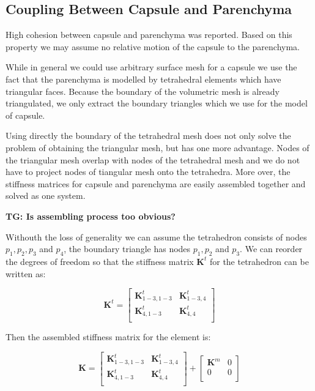 \documentclass{llncs}
\newcommand{\TG}[1]{{\color{blue}\textbf{TG: #1}}}
\newcommand{\Mat}[1]{\mathbf{#1}}
\begin{document}

\subsection{Coupling Between Capsule and Parenchyma} %

High cohesion between capsule and parenchyma was reported. Based on this
property we may assume no relative motion of the capsule to the parenchyma.

While in general we could use arbitrary surface mesh for a capsule we use
the fact that the parenchyma is modelled by tetrahedral elements which have
triangular faces. Because the boundary of the volumetric mesh is already
triangulated, we only extract the boundary triangles which we use for the
model of capsule.

Using directly the boundary of the tetrahedral mesh does not only solve the
problem of obtaining the triangular mesh, but has one more advantage. Nodes
of the triangular mesh overlap with nodes of the tetrahedral mesh and we do
not have to project nodes of tiangular mesh onto the tetrahedra. More over,
the stiffness matrices for capsule and parenchyma are easily assembled
together and solved as one system.

\TG{Is assembling process too obvious?}

Withouth the loss of generality we can assume the tetrahedron consists of
nodes $p_1, p_2, p_3$ and $p_4$, the boundary triangle has nodes $p_1, p_2$
and $p_3$. We can reorder the degrees of freedom so that the stiffness
matrix $\Mat{K}^t$ for the tetrahedron can be written as:

\begin{equation}
  \Mat{K}^t = \left[\begin{array}{c|c}
      \Mat{K}^t_{1-3,1-3} & \Mat{K}^t_{1-3,4} \\
      \hline
      \Mat{K}^t_{4,1-3} & \Mat{K}^t_{4,4} \\
  \end{array}\right]
\end{equation}

Then the assembled stiffness matrix for the element is:

\begin{equation}
  \Mat{K} = \left[\begin{array}{c|c}
      \Mat{K}^t_{1-3,1-3} & \Mat{K}^t_{1-3,4} \\
      \hline
      \Mat{K}^t_{4,1-3} & \Mat{K}^t_{4,4} \\
  \end{array}\right]
  +
  \left[\begin{array}{c|c}
      \Mat{K}^m & 0 \\
      \hline
      0 & 0 \\
  \end{array}\right]
\end{equation}
\end{document}
